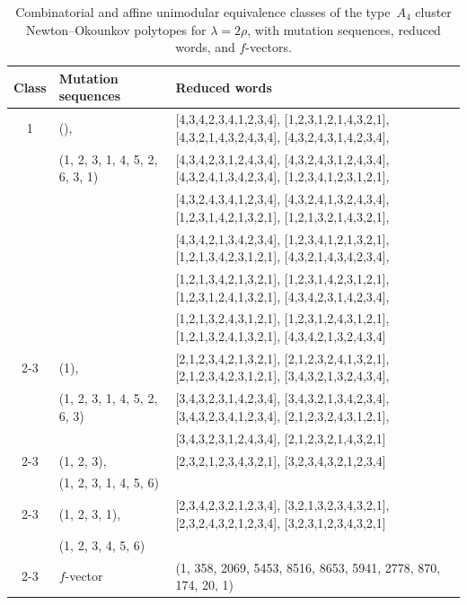 \documentclass[10pt]{amsart}
\numberwithin{equation}{section}
\theoremstyle{plain}
\theoremstyle{definition}
\theoremstyle{remark}
\begin{document}
{\footnotesize
	\setlength{\tabcolsep}{3pt}
	\begin{longtable}{c|l|l}
		\caption{Combinatorial and affine unimodular equivalence
			classes of the type~$A_4$ cluster Newton--Okounkov
			polytopes for $\lambda=2\rho$, with mutation sequences,
			reduced words, and $f$-vectors.}\label{tab:class-summary} \\
		\toprule 
		Class &  Mutation sequences & Reduced words \\ 
		\midrule
		\midrule
		1 & (), & [4,3,4,2,3,4,1,2,3,4], [1,2,3,1,2,1,4,3,2,1], [4,3,2,1,4,3,2,4,3,4], [4,3,2,4,3,1,4,2,3,4], \\
		& (1, 2, 3, 1, 4, 5, 2, 6, 3, 1) & [4,3,4,2,3,1,2,4,3,4], [4,3,2,4,3,1,2,4,3,4], [4,3,2,4,1,3,4,2,3,4], [1,2,3,4,1,2,3,1,2,1], \\
		&  & [4,3,2,4,3,4,1,2,3,4], [4,3,2,4,1,3,2,4,3,4], [1,2,3,1,4,2,1,3,2,1], [1,2,1,3,2,1,4,3,2,1], \\
		&  & [4,3,4,2,1,3,4,2,3,4], [1,2,3,4,1,2,1,3,2,1], [1,2,1,3,4,2,3,1,2,1], [4,3,2,1,4,3,4,2,3,4], \\
		&  & [1,2,1,3,4,2,1,3,2,1], [1,2,3,1,4,2,3,1,2,1], [1,2,3,1,2,4,1,3,2,1], [4,3,4,2,3,1,4,2,3,4], \\
		&  & [1,2,1,3,2,4,3,1,2,1], [1,2,3,1,2,4,3,1,2,1], [1,2,1,3,2,4,1,3,2,1], [4,3,4,2,1,3,2,4,3,4] \\ \cline{2-3}
		
		& (1), & [2,1,2,3,4,2,1,3,2,1], [2,1,2,3,2,4,1,3,2,1], [2,1,2,3,4,2,3,1,2,1], [3,4,3,2,1,3,2,4,3,4], \\
		& (1, 2, 3, 1, 4, 5, 2, 6, 3) & [3,4,3,2,3,1,4,2,3,4], [3,4,3,2,1,3,4,2,3,4], [3,4,3,2,3,4,1,2,3,4], [2,1,2,3,2,4,3,1,2,1], \\
		&  & [3,4,3,2,3,1,2,4,3,4], [2,1,2,3,2,1,4,3,2,1] \\ \cline{2-3}
		
		& (1, 2, 3), & [2,3,2,1,2,3,4,3,2,1], [3,2,3,4,3,2,1,2,3,4] \\
		& (1, 2, 3, 1, 4, 5, 6) &  \\ \cline{2-3}
		
		& (1, 2, 3, 1), & [2,3,4,2,3,2,1,2,3,4], [3,2,1,3,2,3,4,3,2,1], [2,3,2,4,3,2,1,2,3,4], [3,2,3,1,2,3,4,3,2,1] \\
		& (1, 2, 3, 4, 5, 6) &  \\ \cline{2-3}
		
		& $f$-vector & (1, 358, 2069, 5453, 8516, 8653, 5941, 2778, 870, 174, 20, 1) \\
		\midrule
		

\end{longtable}}
\end{document}

